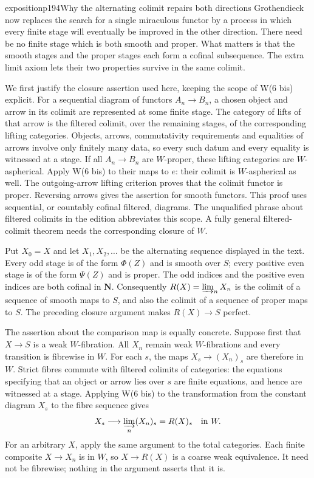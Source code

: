 \begin{dcomment}{exposition}{p194}{Why the alternating colimit repairs both directions}
Grothendieck now replaces the search for a single miraculous functor by a process in which every finite stage will eventually be improved in the other direction. There need be no finite stage which is both smooth and proper. What matters is that the smooth stages and the proper stages each form a cofinal subsequence. The extra limit axiom lets their two properties survive in the same colimit.

We first justify the closure assertion used here, keeping the scope of W(6 bis) explicit. For a sequential diagram of functors $A_n\to B_n$, a chosen object and arrow in its colimit are represented at some finite stage. The category of lifts of that arrow is the filtered colimit, over the remaining stages, of the corresponding lifting categories. Objects, arrows, commutativity requirements and equalities of arrows involve only finitely many data, so every such datum and every equality is witnessed at a stage. If all $A_n\to B_n$ are $W$-proper, these lifting categories are $W$-aspherical. Apply W(6 bis) to their maps to $e$: their colimit is $W$-aspherical as well. The outgoing-arrow lifting criterion proves that the colimit functor is proper. Reversing arrows gives the assertion for smooth functors. This proof uses sequential, or countably cofinal filtered, diagrams. The unqualified phrase about filtered colimits in the edition abbreviates this scope. A fully general filtered-colimit theorem needs the corresponding closure of $W$.

Put $X_0=X$ and let $X_1,X_2,\ldots$ be the alternating sequence displayed in the text. Every odd stage is of the form $\Phi(Z)$ and is smooth over $S$; every positive even stage is of the form $\Psi(Z)$ and is proper. The odd indices and the positive even indices are both cofinal in $\mathbf N$. Consequently $R(X)=\varinjlim_nX_n$ is the colimit of a sequence of smooth maps to $S$, and also the colimit of a sequence of proper maps to $S$. The preceding closure argument makes $R(X)\to S$ perfect.

The assertion about the comparison map is equally concrete. Suppose first that $X\to S$ is a weak $W$-fibration. All $X_n$ remain weak $W$-fibrations and every transition is fibrewise in $W$. For each $s$, the maps $X_s\to(X_n)_s$ are therefore in $W$. Strict fibres commute with filtered colimits of categories: the equations specifying that an object or arrow lies over $s$ are finite equations, and hence are witnessed at a stage. Applying W(6 bis) to the transformation from the constant diagram $X_s$ to the fibre sequence gives
\[
X_s\longrightarrow\varinjlim_n(X_n)_s=R(X)_s\quad\text{in }W.
\]
For an arbitrary $X$, apply the same argument to the total categories. Each finite composite $X\to X_n$ is in $W$, so $X\to R(X)$ is a coarse weak equivalence. It need not be fibrewise; nothing in the argument asserts that it is.


\end{dcomment}
